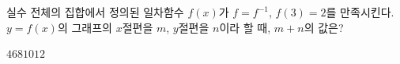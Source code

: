실수 전체의 집합에서 정의된 일차함수 $f(x)$가 $f=f^{-1}$, $f(3)=2$를 만족시킨다. $y=f(x)$의 그래프의 $x$절편을 $m$, $y$절편을 $n$이라 할 때, $m+n$의 값은?
\begin{choices32}{$4$}{$6$}{$8$}{$10$}{$12$}\end{choices32}
